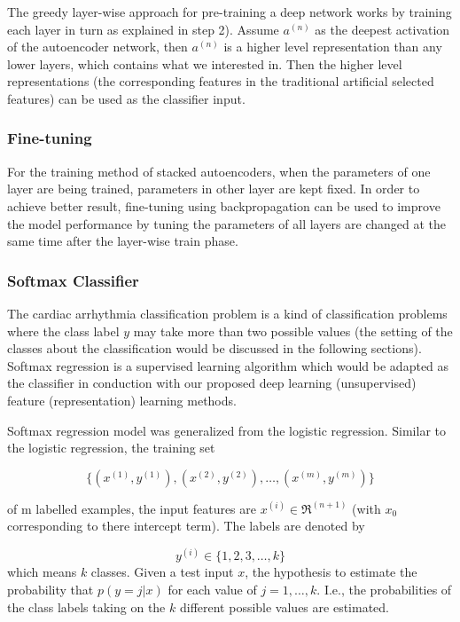 \documentclass[journal]{IEEEtran}
\begin{document}
The greedy layer-wise approach for pre-training a deep network works by training each layer in turn as explained in step 2). Assume $a^{(n)}$ as the deepest activation of the autoencoder network, then $a^{(n)}$ is a higher level representation than any lower layers, which contains what we interested in. Then the higher level representations (the corresponding features in the traditional artificial selected features) can be used as the classifier input.

\subsubsection{Fine-tuning}
For the training method of stacked autoencoders, when the parameters of one layer are being trained, parameters in other layer are kept fixed. In order to achieve better result, fine-tuning using backpropagation can be used to improve the model performance by tuning the parameters of all layers are changed at the same time after the layer-wise train phase.

\subsubsection{Softmax Classifier}
The cardiac arrhythmia classification problem is a kind of classification problems where the class label $y$ may take more than two possible values (the setting of the classes about the classification would be discussed in the following sections). Softmax regression is a supervised learning algorithm which would be adapted as the classifier in conduction with our proposed deep learning (unsupervised) feature (representation) learning methods. 

Softmax regression model was generalized  from the logistic regression. Similar to the logistic regression, the training set

\begin{equation}
\{(x^{(1)},y^{(1)}), (x^{(2)},y^{(2)}), \ldots, (x^{(m)},y^{(m)}) \}
\end{equation}

\noindent of m labelled examples, the input features are $x^{(i)} \in \Re^{(n+1)}$ (with $x_0$ corresponding to there intercept term). The labels are denoted by 

\begin{equation}
y^{(i)} \in \{1,2,3,\ldots,k\}
\end{equation}
\noindent which means $k$ classes.
Given a test input $x$, the hypothesis to estimate the probability that $p(y=j|x)$ for each value of $j=1,\ldots,k$. I.e., the probabilities of the class labels taking on the $k$ different possible values are estimated. 
\end{document}
